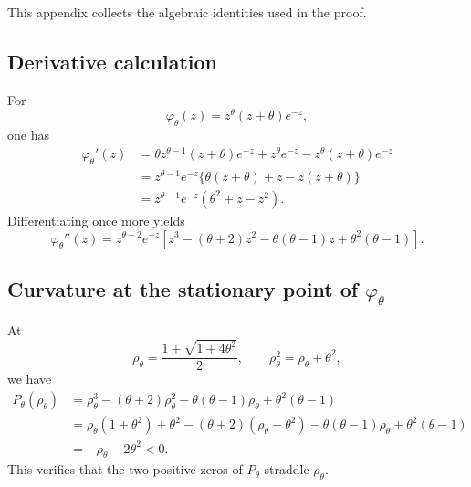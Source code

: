 \documentclass[11pt]{article}
\theoremstyle{definition}
\begin{document}
This appendix collects the algebraic identities used in the proof.

\subsection{Derivative calculation}

For
\[
  \varphi_\theta(z)=z^\theta(z+\theta)e^{-z},
\]
one has
\begin{align*}
  \varphi_\theta'(z)
  &=\theta z^{\theta-1}(z+\theta)e^{-z}+z^\theta e^{-z}-z^\theta(z+\theta)e^{-z} \\
  &=z^{\theta-1}e^{-z}\{\theta(z+\theta)+z-z(z+\theta)\} \\
  &=z^{\theta-1}e^{-z}(\theta^2+z-z^2).
\end{align*}
Differentiating once more yields
\[
  \varphi_\theta''(z)=z^{\theta-2}e^{-z}
  \left[z^3-(\theta+2)z^2-\theta(\theta-1)z+
  \theta^2(\theta-1)\right].
\]

\subsection{\texorpdfstring{Curvature at the stationary point of $\varphi_\theta$}{Curvature at the stationary point of phi theta}}

At
\[
  \rho_\theta=\frac{1+\sqrt{1+4\theta^2}}{2},
  \qquad \rho_\theta^2=\rho_\theta+\theta^2,
\]
we have
\begin{align*}
  P_\theta(\rho_\theta)
  &=\rho_\theta^3-(\theta+2)\rho_\theta^2
    -\theta(\theta-1)\rho_\theta+\theta^2(\theta-1) \\
  &=\rho_\theta(1+\theta^2)+\theta^2
    -(\theta+2)(\rho_\theta+\theta^2)
    -\theta(\theta-1)\rho_\theta+\theta^2(\theta-1) \\
  &=-\rho_\theta-2\theta^2<0.
\end{align*}
This verifies that the two positive zeros of $P_\theta$ straddle $\rho_\theta$.
\end{document}
